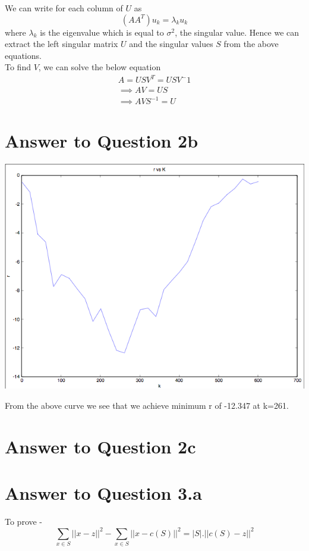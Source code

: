 \documentclass[11pt]{article}
\begin{document}
{We can write for each column of $U$ as
$$(AA^T) u_k = \lambda_k u_k$$ where $\lambda_k$ is the eigenvalue which is equal to $\sigma^2$, the singular value. Hence we can extract the left singular matrix $U$ and the singular values $S$ from the above equations.\\

To find $V$, we can solve the below equation
\begin{align*}
A = U S V^T = U S V^-1\\
\implies A V = U S\\
\implies A V S^{-1} = U
\end{align*}	

\pagebreak[4]
\section*{Answer to Question 2b}
\includegraphics[scale=0.8]{q2err}

From the above curve we see that we achieve minimum r of -12.347 at k=261.

\pagebreak[4]
\section*{Answer to Question 2c}

\pagebreak[4]
\section*{Answer to Question 3.a}
To prove -
$$\sum_{x \in S} || x - z ||^2 - \sum_{x \in S} || x - c(S)||^2 = |S| . || c(S) - z ||^2$$

}
\end{document}
